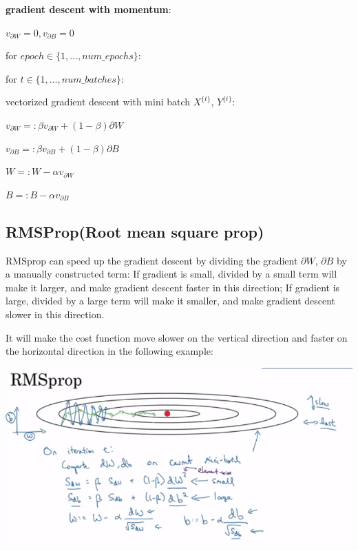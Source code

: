 \documentclass{article}
\begin{document}
\noindent \textbf{gradient descent with momentum}:

\noindent \(v_{\partial W} = 0, v_{\partial B} = 0\)

\noindent for \(epoch \in \{1, \dots, num\_epochs\}\):

\noindent \hspace{.5cm} for \(t \in \{1, \dots, num\_batches\}\):

\noindent \hspace{1cm} vectorized gradient descent with mini batch \(X^{\{t\}}\), \(Y^{\{t\}}\):

\noindent \hspace{1cm} \(v_{\partial W} =: \beta v_{\partial W} + (1 - \beta) \partial W\)

\noindent \hspace{1cm} \(v_{\partial B} =: \beta v_{\partial B} + (1 - \beta) \partial B\)

\noindent \hspace{1cm} \(W =: W - \alpha v_{\partial W}\)

\noindent \hspace{1cm} \(B =: B - \alpha v_{\partial B}\)

\subsection{RMSProp(Root mean square prop)}

\noindent RMSprop can speed up the gradient descent by dividing the gradient \(\partial W\), \(\partial B\) by a manually constructed term: If gradient is small, divided by a small term will make it larger, and make gradient descent faster in this direction; If gradient is large, divided by a large term will make it smaller, and make gradient descent slower in this direction.

\bigskip

\noindent It will make the cost function move slower on the vertical direction and faster on the horizontal direction in the following example:

\begin{center}
\includegraphics[scale=0.4]{./images/RMSprop.png}
\end{center}
\end{document}

